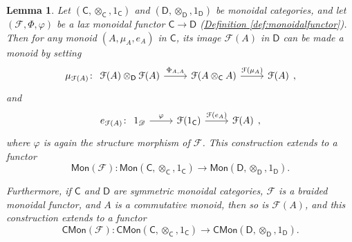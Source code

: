 \documentclass[a4paper,10pt]{scrreprt}
\theoremstyle{definition}
\theoremstyle{plain}
\newtheorem{lemma}{Lemma}[section]
\theoremstyle{remark}
\begin{document}
\begin{lemma}
  \label{lemma:monoidalfunctorspreserveinternalmonoids}
  Let $(\mathsf{C}, \otimes_{\mathsf{C}}, 1_{\mathsf{C}})$ and $(\mathsf{D}, \otimes_{\mathsf{D}}, 1_{\mathsf{D}})$ be monoidal categories, and let $(\mathcal{F}, \Phi, \varphi)$ be a lax monoidal functor $\mathsf{C} \to \mathsf{D}$ (\hyperref[def:monoidalfunctor]{Definition \ref*{def:monoidalfunctor}}). Then for any monoid $(A, \mu_{A}, e_{A})$ in $\mathsf{C}$, its image $\mathcal{F}(A)$ in $\mathsf{D}$ can be made a monoid by setting
  \begin{equation*}
    \mu_{\mathcal{F}(A)}\colon 
    \begin{tikzcd}
      \mathcal{F}(A) \otimes_{\mathsf{D}} \mathcal{F}(A) 
      \arrow[r, "{\Phi_{A, A}}"]
      & \mathcal{F}(A \otimes_{\mathsf{C}} A) 
      \arrow[r, "\mathcal{F}(\mu_{A})"]
      & \mathcal{F}(A)
    \end{tikzcd},
  \end{equation*}
  and
  \begin{equation*}
    e_{\mathcal{F}(A)}\colon
    \begin{tikzcd}
      1_{\mathscr{D}}
      \arrow[r, "\varphi"]
      & \mathcal{F}(1_{\mathsf{C}})
      \arrow[r, "\mathcal{F}(e_{A})"]
      & \mathcal{F}(A)
    \end{tikzcd},
  \end{equation*}
  where $\varphi$ is again the structure morphism of $\mathcal{F}$. This construction extends to a functor 
  \begin{equation*}
    \mathsf{Mon}(\mathcal{F})\colon \mathsf{Mon}(\mathsf{C}, \otimes_{\mathsf{C}}, 1_{\mathsf{C}}) \to \mathsf{Mon}(\mathsf{D}, \otimes_{\mathsf{D}}, 1_{\mathsf{D}}).
  \end{equation*}

  Furthermore, if $\mathsf{C}$ and $\mathsf{D}$ are symmetric monoidal categories, $\mathcal{F}$ is a braided monoidal functor, and $A$ is a commutative monoid, then so is $\mathcal{F}(A)$, and this construction extends to a functor
  \begin{equation*}
    \mathsf{CMon}(\mathcal{F})\colon \mathsf{CMon}(\mathsf{C}, \otimes_{\mathsf{C}}, 1_{\mathsf{C}}) \to \mathsf{CMon}(\mathsf{D}, \otimes_{\mathsf{D}}, 1_{\mathsf{D}}). 
  \end{equation*}
\end{lemma} 
\end{document}
